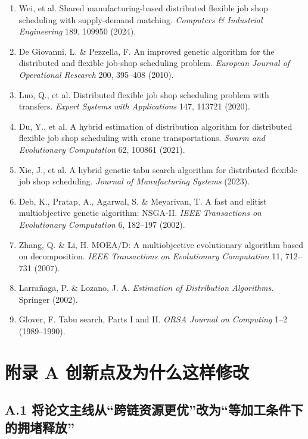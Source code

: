 \documentclass[UTF8,11pt]{ctexart}
\begin{document}
\begin{enumerate}
\item Wei, et al. Shared manufacturing-based distributed flexible job shop scheduling with supply-demand matching. \emph{Computers \& Industrial Engineering} 189, 109950 (2024).
\item De Giovanni, L. \& Pezzella, F. An improved genetic algorithm for the distributed and flexible job-shop scheduling problem. \emph{European Journal of Operational Research} 200, 395–408 (2010).
\item Luo, Q., et al. Distributed flexible job shop scheduling problem with transfers. \emph{Expert Systems with Applications} 147, 113721 (2020).
\item Du, Y., et al. A hybrid estimation of distribution algorithm for distributed flexible job shop scheduling with crane transportations. \emph{Swarm and Evolutionary Computation} 62, 100861 (2021).
\item Xie, J., et al. A hybrid genetic tabu search algorithm for distributed flexible job shop scheduling. \emph{Journal of Manufacturing Systems} (2023).
\item Deb, K., Pratap, A., Agarwal, S. \& Meyarivan, T. A fast and elitist multiobjective genetic algorithm: NSGA-II. \emph{IEEE Transactions on Evolutionary Computation} 6, 182–197 (2002).
\item Zhang, Q. \& Li, H. MOEA/D: A multiobjective evolutionary algorithm based on decomposition. \emph{IEEE Transactions on Evolutionary Computation} 11, 712–731 (2007).
\item Larrañaga, P. \& Lozano, J. A. \emph{Estimation of Distribution Algorithms}. Springer (2002).
\item Glover, F. Tabu search, Parts I and II. \emph{ORSA Journal on Computing} 1–2 (1989–1990).
\end{enumerate}

\clearpage

\clearpage
\section*{附录 A 创新点及为什么这样修改}

\subsection*{A.1 将论文主线从“跨链资源更优”改为“等加工条件下的拥堵释放”}
\end{document}
